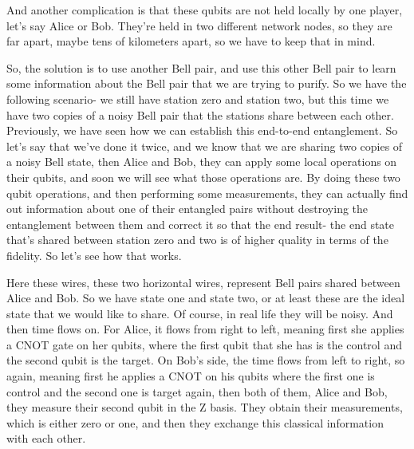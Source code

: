 And another complication is that these qubits are not held locally by one player, let's say Alice or Bob. They're held in two different network nodes, so they are far apart, maybe tens of kilometers apart, so we have to keep that in mind.

So, the solution is to use another Bell pair, and use this other Bell pair to learn some information about the Bell pair that we are trying to purify. So we have the following scenario- we still have station zero and station two, but this time we have two copies of a noisy Bell pair that the stations share between each other. Previously, we have seen how we can establish this end-to-end entanglement. So let's say that we've done it twice, and we know that we are sharing two copies of a noisy Bell state, then Alice and Bob, they can apply some local operations on their qubits, and soon we will see what those operations are. By doing these two qubit operations, and then performing some measurements, they can actually find out information about one of their entangled pairs without destroying the entanglement between them and correct it so that the end result- the end state that's shared between station zero and two is of higher quality in terms of the fidelity. So let's see how that works.

Here these wires, these two horizontal wires, represent Bell pairs shared between Alice and Bob. So we have state  \ket{\Phi^+} one and state  \ket{\Phi^+} two, or at least these are the ideal state that we would like to share. Of course, in real life they will be noisy. And then time flows on. For Alice, it flows from right to left, meaning first she applies a CNOT gate on her qubits, where the first qubit that she has is the control and the second qubit is the target. On Bob's side, the time flows from left to right, so again, meaning first he applies a CNOT on his qubits where the first one is control and the second one is target again, then both of them, Alice and Bob, they measure their second qubit in the Z basis. They obtain their measurements, which is either zero or one, and then they exchange this classical information with each other.

